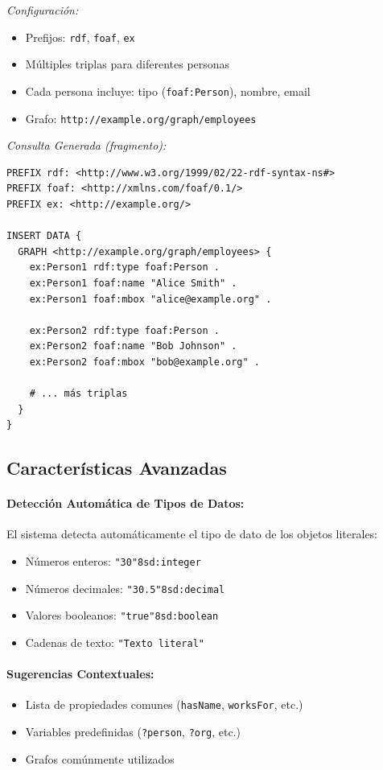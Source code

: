 \documentclass{article}
\begin{document}
\textit{Configuración:}
\begin{itemize}
    \item Prefijos: \texttt{rdf}, \texttt{foaf}, \texttt{ex}
    \item Múltiples triplas para diferentes personas
    \item Cada persona incluye: tipo (\texttt{foaf:Person}), nombre, email
    \item Grafo: \texttt{http://example.org/graph/employees}
\end{itemize}

\textit{Consulta Generada (fragmento):}
\begin{verbatim}
PREFIX rdf: <http://www.w3.org/1999/02/22-rdf-syntax-ns#>
PREFIX foaf: <http://xmlns.com/foaf/0.1/>
PREFIX ex: <http://example.org/>

INSERT DATA {
  GRAPH <http://example.org/graph/employees> {
    ex:Person1 rdf:type foaf:Person .
    ex:Person1 foaf:name "Alice Smith" .
    ex:Person1 foaf:mbox "alice@example.org" .
    
    ex:Person2 rdf:type foaf:Person .
    ex:Person2 foaf:name "Bob Johnson" .
    ex:Person2 foaf:mbox "bob@example.org" .
    
    # ... más triplas
  }
}
\end{verbatim}

\subsection{Características Avanzadas}
\label{subsec:triple-features}

\paragraph{Detección Automática de Tipos de Datos:}
El sistema detecta automáticamente el tipo de dato de los objetos literales:
\begin{itemize}
    \item Números enteros: \texttt{"30"^^xsd:integer}
    \item Números decimales: \texttt{"30.5"^^xsd:decimal}
    \item Valores booleanos: \texttt{"true"^^xsd:boolean}
    \item Cadenas de texto: \texttt{"Texto literal"}
\end{itemize}

\paragraph{Sugerencias Contextuales:}
\begin{itemize}
    \item Lista de propiedades comunes (\texttt{hasName}, \texttt{worksFor}, etc.)
    \item Variables predefinidas (\texttt{?person}, \texttt{?org}, etc.)
    \item Grafos comúnmente utilizados
\end{itemize}
\end{document}

